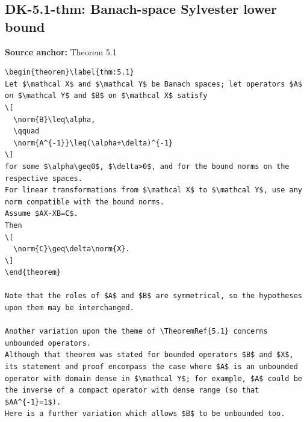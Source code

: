 \subsection*{DK-5.1-thm: Banach-space Sylvester lower bound}
\noindent\textbf{Source anchor:} Theorem 5.1\\
\begin{verbatim}
\begin{theorem}\label{thm:5.1}
Let $\mathcal X$ and $\mathcal Y$ be Banach spaces; let operators $A$ on $\mathcal Y$ and $B$ on $\mathcal X$ satisfy
\[
  \norm{B}\leq\alpha,
  \qquad
  \norm{A^{-1}}\leq(\alpha+\delta)^{-1}
\]
for some $\alpha\geq0$, $\delta>0$, and for the bound norms on the respective spaces.
For linear transformations from $\mathcal X$ to $\mathcal Y$, use any norm compatible with the bound norms.
Assume $AX-XB=C$.
Then
\[
  \norm{C}\geq\delta\norm{X}.
\]
\end{theorem}

Note that the roles of $A$ and $B$ are symmetrical, so the hypotheses upon them may be interchanged.

Another variation upon the theme of \TheoremRef{5.1} concerns unbounded operators.
Although that theorem was stated for bounded operators $B$ and $X$, its statement and proof encompass the case where $A$ is an unbounded operator with domain dense in $\mathcal Y$; for example, $A$ could be the inverse of a compact operator with dense range (so that $AA^{-1}=1$).
Here is a further variation which allows $B$ to be unbounded too.
\end{verbatim}

